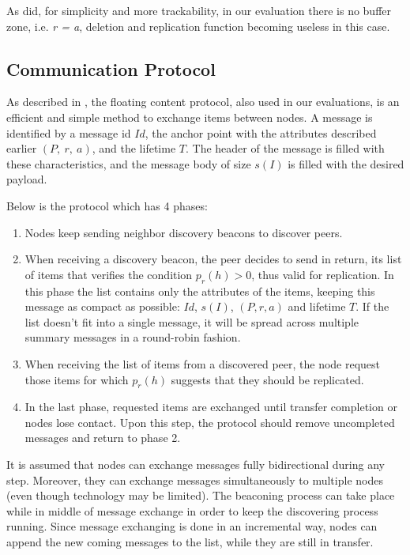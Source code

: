 As \cite{percomfloatingcontent} did, for simplicity and more trackability, in
our evaluation there is no buffer zone, i.e. {\it r = a}, deletion and replication
function becoming useless in this case.

\subsection{Communication Protocol}

As described in \cite{percomfloatingcontent}, the floating content protocol,
also used in our evaluations, is an efficient and simple method to exchange
items between nodes. A message is identified by a message id $Id$, the anchor point
with the attributes described earlier $(P,\ r,\ a)$, and the lifetime $T$. The
header of the message is filled with these characteristics, and the message body
of size $s(I)$ is filled with the desired payload.

Below is the protocol which has 4 phases:

\begin{enumerate}[1.]
  \item Nodes keep sending neighbor discovery beacons to discover peers.
  \item When receiving a discovery beacon, the peer decides to send in return,
  its list of items that verifies the condition $p_r(h) > 0$, thus valid for
  replication. In this phase the list contains only the attributes of the items,
  keeping this message as compact as possible: $Id$, $s(I)$, $(P, r, a)$ and
  lifetime $T$. If the list doesn't fit into a single message, it will be spread
  across multiple summary messages in a round-robin fashion.
  \item When receiving the list of items from a discovered peer, the node
  request those items for which $p_r(h)$ suggests that they should be replicated.
  \item In the last phase, requested items are exchanged until transfer
  completion or nodes lose contact. Upon this step, the protocol should remove
  uncompleted messages and return to phase 2.
\end{enumerate}

It is assumed that nodes can exchange messages fully bidirectional during any
step. Moreover, they can exchange messages simultaneously to multiple nodes
(even though technology may be limited). The beaconing process can take place
while in middle of message exchange in order to keep the discovering process
running. Since message exchanging is done in an incremental way, nodes can
append the new coming messages to the list, while they are still in transfer.

